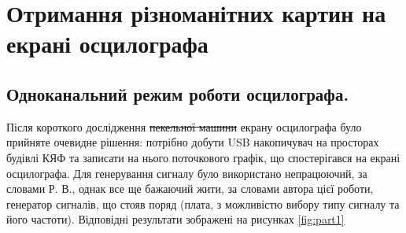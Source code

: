 \chapter{Отримання різноманітних картин на екрані осцилографа} 
\label{chapter:first}

\section{Одноканальний режим роботи осцилографа.}

Після короткого дослідження \sout{пекельної машини} екрану осцилографа було прийняте очевидне рішення: потрібно добути USB накопичувач на просторах будівлі КЯФ та записати на нього поточкового графік, що спостерігався на екрані осцилографа. Для генерування сигналу було використано непрацюючий, за словами Р. В., однак все ще бажаючий жити, за словами автора цієї роботи, генератор сигналів, що стояв поряд (плата, з можливістю вибору типу сигналу та його частоти). Відповідні результати зображені на рисунках \ref{fig:part1}

